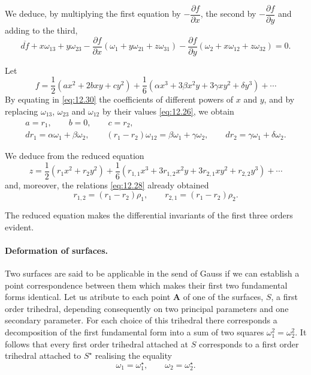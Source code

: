 \documentclass[leqno,11pt]{book}
\numberwithin{equation}{chapter}
\newcommand{\pd}{\partial}
\theoremstyle{shape1}
\theoremstyle{shapesmall}
\newcommand{\str}{^{\star}}
\begin{document}
We deduce, by multiplying the first equation by $-\dfrac{\pd f}{\pd x}$, the second by $-\dfrac{\pd f}{\pd y}$ and adding to the third,
\begin{equation}
  \label{eq:12.30}
  \overline{df}+x\omega_{13}+y\omega_{23}-\frac{\pd f}{\pd x}(\omega_{1}+y\omega_{21}+z\omega_{31})-\frac{\pd f}{\pd y}(\omega_{2}+x\omega_{12}+z\omega_{32})=0.
\end{equation}

Let
\[
f=\frac{1}{2}(ax^{2}+2bxy+cy^{2})+\frac{1}{6}(\alpha x^{3}+3\beta x^{2}y+3\gamma xy^{2}+\delta y^{3})+\cdots
\]
By equating in \eqref{eq:12.30} the coefficients of different powers of $x$ and $y$, and by replacing $\omega_{13}$, $\omega_{23}$ and $\omega_{12}$ by their values \eqref{eq:12.26}, we obtain
\begin{gather*}
  a=r_{1},\qquad b=0,\qquad c=r_{2},\\
  dr_{1}=\alpha\omega_{1}+\beta\omega_{2},\qquad(r_{1}-r_{2})\omega_{12}=\beta\omega_{1}+\gamma\omega_{2},\qquad dr_{2}=\gamma\omega_{1}+\delta\omega_{2}.
\end{gather*}

We deduce from the reduced equation
\[
z=\frac{1}{2}(r_{1}x^{2}+r_{2}y^{2})+\frac{1}{6}(r_{1,1}x^{3}+3r_{1,2}x^{2}y+3r_{2,1}xy^{2}+r_{2,2}y^{3})+\cdots
\]
and, moreover, the relations \eqref{eq:12.28} already obtained
\[
r_{1,2}=(r_{1}-r_{2})\rho_{1},\qquad r_{2,1}=(r_{1}-r_{2})\rho_{2}.
\]

The reduced equation makes the differential invariants of the first three orders evident.

\paragraph{Deformation of surfaces.}
\label{sec:195}
Two surfaces are said to be applicable in the send of Gauss if we can establish a point correspondence between them which makes their first two fundamental forms identical. Let us atribute to each point $\mathbf{A}$ of one of the surfaces, $S$, a first order trihedral, depending consequently on two principal parameters and one secondary parameter. For each choice of this trihedral there corresponds a decomposition of the first fundamental form into a sum of two squares $\omega_{1}^{2}=\omega_{2}^{2}$. It follows that every first order trihedral attached at $S$ corresponds to a first order trihedral attached to $S\str$ realising the equality
\begin{equation}
  \label{eq:12.31}
  \omega_{1}=\omega_{1}\str,\qquad\omega_{2}=\omega_{2}\str.
\end{equation}
\end{document}
